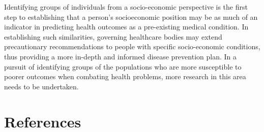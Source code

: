 \documentclass[]{article}
\begin{document}
Identifying groups of individuals from a socio-economic perspective is
the first step to establishing that a person's socioeconomic position
may be as much of an indicator in predicting health outcomes as a
pre-existing medical condition. In establishing such similarities,
governing healthcare bodies may extend precautionary recommendations to
people with specific socio-economic conditions, thus providing a more
in-depth and informed disease prevention plan. In a pursuit of
identifying groups of the populations who are more susceptible to poorer
outcomes when combating health problems, more research in this area
needs to be undertaken.

\hypertarget{references}{%
\section*{References}\label{references}}
\end{document}
